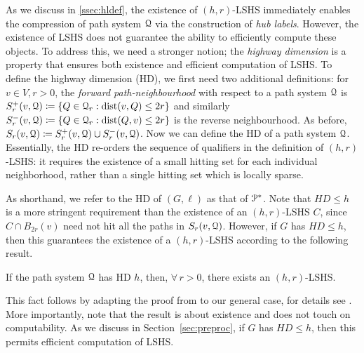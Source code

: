 As we discuss in \cref{ssec:hldef}, the existence of $(h,r)$-LSHS immediately enables the compression of path system $\calQ$ via the construction of \emph{hub labels}. 
However, the existence of LSHS does not guarantee the ability to efficiently compute these objects. 
To address this, we need a stronger notion; the \emph{highway dimension} is a property that ensures both existence and efficient computation of LSHS.
To define the highway dimension (HD), we first need two additional definitions:
for $v\in V, r>0$, the \emph{forward path-neighbourhood} with respect to a path system $\calQ$ is $
S_r^+(v,\calQ) \defeq\crl*{Q\in\calQ_r: \dist(v,Q)\leq 2r}$ and similarly $S_r^-(v,\calQ) \defeq\crl*{Q\in\calQ_r: \dist(Q,v)\leq 2r}$ is the reverse neighbourhood.
As before, $S_r(v,\calQ) \defeq S_r^+(v,\calQ)\cup S_r^-(v,\calQ)$. 
Now we can define the HD of a path system $\calQ$. 
Essentially, the HD re-orders the sequence of qualifiers in the definition of $(h,r)$-LSHS: it requires the existence of a small hitting set for each individual neighborhood, rather than a single hitting set which is locally sparse. 

As shorthand, we refer to the HD of $(G,\ell)$ as that of $\PS$. 
Note that $HD\leq h$ is a more stringent requirement than the existence of an $(h,r)$-LSHS $C$, since $C\cap B_{2r}(v)$ need not hit all the paths in $S_r(v,\calQ)$. 
However, if $G$ has $HD \leq h$, then this guarantees the existence of a $(h,r)$-LSHS according to the following result.
\begin{proposition}\label{prop:equiv}
If the path system $\calQ$ has HD $h$, then, $\forall\,r>0$, there exists an $(h,r)$-LSHS.
\end{proposition}

This fact follows by adapting the proof from \cite[Theorem 4.2]{highway2013} to our general case, for details see \cite{TechReport}.
More importantly, note that the result is about existence and does not touch on computability.
As we discuss in Section~\ref{sec:preproc}, if $G$ has $HD \leq h$, then this permits efficient computation of LSHS.
